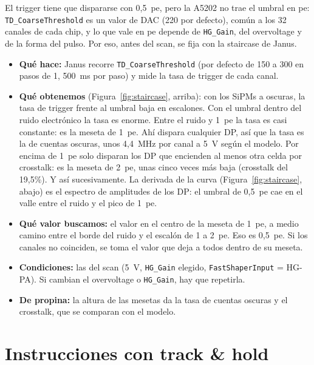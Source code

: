 \documentclass[11pt,a4paper]{article}
\begin{document}
El trigger tiene que dispararse con 0,5~pe, pero la A5202 no trae el umbral
en pe: \texttt{TD\_CoarseThreshold} es un valor de DAC (220 por defecto),
común a los 32 canales de cada chip, y lo que vale en pe depende de
\texttt{HG\_Gain}, del overvoltage y de la forma del pulso. Por eso, antes del
scan, se fija con la staircase de Janus.

\begin{itemize}
\item {\bf Qué hace:} Janus recorre \texttt{TD\_CoarseThreshold} (por defecto
  de 150 a 300 en pasos de 1, 500~ms por paso) y mide la tasa de trigger de
  cada canal. 
\item {\bf Qué obtenemos} (Figura~\ref{fig:staircase}, arriba): con los
  SiPMs a oscuras, la tasa de trigger frente al umbral baja en escalones.
  Con el umbral dentro del ruido electrónico la tasa es enorme. Entre el
  ruido y 1~pe la tasa es casi constante: es la meseta de 1~pe. Ahí dispara
  cualquier DP, así que la tasa es la de cuentas oscuras, unos 4,4~MHz por
  canal a 5~V según el modelo. Por encima de 1~pe solo disparan los DP que
  encienden al menos otra celda por crosstalk: es la meseta de 2~pe, unas
  cinco veces más baja (crosstalk del 19,5\%). Y así sucesivamente. La
  derivada de la curva (Figura~\ref{fig:staircase}, abajo) es el espectro de
  amplitudes de los DP: el umbral de 0,5~pe cae en el valle entre el ruido y
  el pico de 1~pe.
\item {\bf Qué valor buscamos:} el valor en el centro de la meseta de 1~pe, a
  medio camino entre el borde del ruido y el escalón de 1 a 2~pe. Eso es
  0,5~pe. Si los canales no coinciden, se toma el valor que deja a todos
  dentro de su meseta.
\item {\bf Condiciones:} las del scan (5~V, \texttt{HG\_Gain} elegido,
  \texttt{FastShaperInput} = HG-PA). Si cambian el overvoltage o
  \texttt{HG\_Gain}, hay que repetirla.
\item {\bf De propina:} la altura de las mesetas da la tasa de cuentas
  oscuras y el crosstalk, que se comparan con el modelo.
\end{itemize}



\section{Instrucciones con track \& hold}
\label{sec:th}
\end{document}
